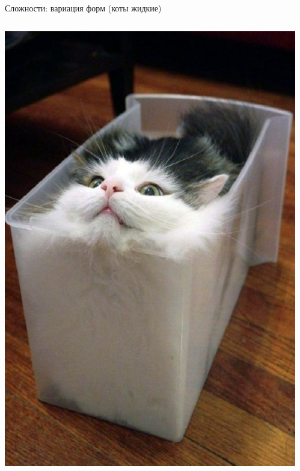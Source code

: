 \documentclass[aspectratio=169, professionalfonts]{beamer}
\begin{document}
\begin{frame}{Сложности: вариация форм (коты жидкие)}
    \begin{columns}
        \begin{column}{.325\linewidth}
            \centering
            \includegraphics[width=\linewidth]{graphs/fig13_1.jpg}
        \end{column}
        \begin{column}{.325\linewidth}
            \centering

\end{column}
\end{columns}
\end{frame}
\end{document}
